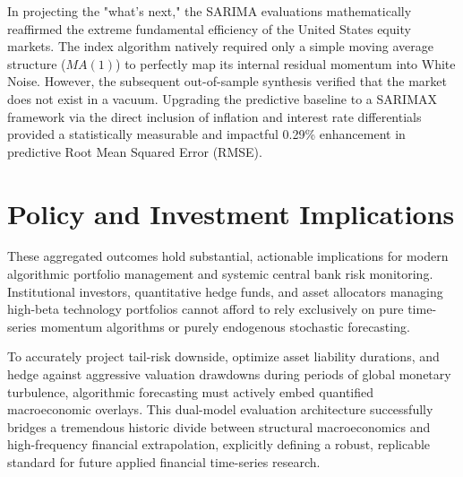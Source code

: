 \documentclass[12pt,a4paper]{report}
\begin{document}
In projecting the "what's next," the SARIMA evaluations mathematically reaffirmed the extreme fundamental efficiency of the United States equity markets. The index algorithm natively required only a simple moving average structure ($MA(1)$) to perfectly map its internal residual momentum into White Noise. However, the subsequent out-of-sample synthesis verified that the market does not exist in a vacuum. Upgrading the predictive baseline to a SARIMAX framework via the direct inclusion of inflation and interest rate differentials provided a statistically measurable and impactful 0.29\% enhancement in predictive Root Mean Squared Error (RMSE). 

\section{Policy and Investment Implications}
These aggregated outcomes hold substantial, actionable implications for modern algorithmic portfolio management and systemic central bank risk monitoring. Institutional investors, quantitative hedge funds, and asset allocators managing high-beta technology portfolios cannot afford to rely exclusively on pure time-series momentum algorithms or purely endogenous stochastic forecasting. 

To accurately project tail-risk downside, optimize asset liability durations, and hedge against aggressive valuation drawdowns during periods of global monetary turbulence, algorithmic forecasting must actively embed quantified macroeconomic overlays. This dual-model evaluation architecture successfully bridges a tremendous historic divide between structural macroeconomics and high-frequency financial extrapolation, explicitly defining a robust, replicable standard for future applied financial time-series research.

\nocite{*}


\end{document}
